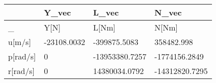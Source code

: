 \begin{tabular}{llll}
& Y_vec & L_vec & N_vec \\ 
\hline 
_ & Y[N] & L[Nm] & N[Nm] \\ 
u[m/s] & -23108.0032 & -399875.5083 & 358482.998 \\ 
p[rad/s] & 0 & -13953380.7257 & -1774156.2849 \\ 
r[rad/s] & 0 & 14380034.0792 & -14312820.7295 \\ 
\hline 
\end{tabular}